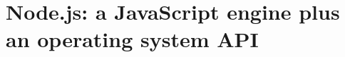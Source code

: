 \chapter{Node.js: a JavaScript engine plus an operating system API}
\label{ch:node-js-a-javascript-engine-plus-an}

